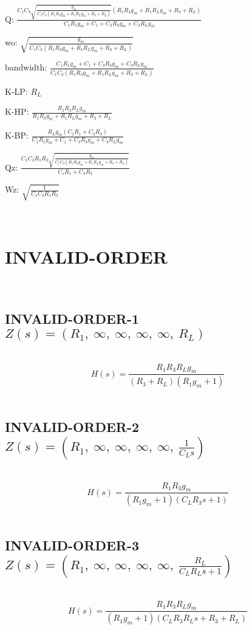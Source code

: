 \documentclass{article}
\begin{document}
Q: $\frac{C_{1} C_{3} \sqrt{\frac{g_{m}}{C_{1} C_{3} \left(R_{1} R_{3} g_{m} + R_{1} R_{L} g_{m} + R_{3} + R_{L}\right)}} \left(R_{1} R_{3} g_{m} + R_{1} R_{L} g_{m} + R_{3} + R_{L}\right)}{C_{1} R_{1} g_{m} + C_{1} + C_{3} R_{3} g_{m} + C_{3} R_{L} g_{m}}$\ 

wo: $\sqrt{\frac{g_{m}}{C_{1} C_{3} \left(R_{1} R_{3} g_{m} + R_{1} R_{L} g_{m} + R_{3} + R_{L}\right)}}$\ 

bandwidth: $\frac{C_{1} R_{1} g_{m} + C_{1} + C_{3} R_{3} g_{m} + C_{3} R_{L} g_{m}}{C_{1} C_{3} \left(R_{1} R_{3} g_{m} + R_{1} R_{L} g_{m} + R_{3} + R_{L}\right)}$\ 

K-LP: $R_{L}$\ 

K-HP: $\frac{R_{1} R_{3} R_{L} g_{m}}{R_{1} R_{3} g_{m} + R_{1} R_{L} g_{m} + R_{3} + R_{L}}$\ 

K-BP: $\frac{R_{L} g_{m} \left(C_{1} R_{1} + C_{3} R_{3}\right)}{C_{1} R_{1} g_{m} + C_{1} + C_{3} R_{3} g_{m} + C_{3} R_{L} g_{m}}$\ 

Qz: $\frac{C_{1} C_{3} R_{1} R_{3} \sqrt{\frac{g_{m}}{C_{1} C_{3} \left(R_{1} R_{3} g_{m} + R_{1} R_{L} g_{m} + R_{3} + R_{L}\right)}}}{C_{1} R_{1} + C_{3} R_{3}}$\ 

Wz: $\sqrt{\frac{1}{C_{1} C_{3} R_{1} R_{3}}}$\ 

\ 

\section{INVALID-ORDER}\ 
\subsection{INVALID-ORDER-1 $Z(s) = \left( R_{1}, \  \infty, \  \infty, \  \infty, \  \infty, \  R_{L}\right)$ } \ 
\textbf{\[H(s) = \frac{R_{1} R_{3} R_{L} g_{m}}{\left(R_{3} + R_{L}\right) \left(R_{1} g_{m} + 1\right)}\] } \ 
\subsection{INVALID-ORDER-2 $Z(s) = \left( R_{1}, \  \infty, \  \infty, \  \infty, \  \infty, \  \frac{1}{C_{L} s}\right)$ } \ 
\textbf{\[H(s) = \frac{R_{1} R_{3} g_{m}}{\left(R_{1} g_{m} + 1\right) \left(C_{L} R_{3} s + 1\right)}\] } \ 
\subsection{INVALID-ORDER-3 $Z(s) = \left( R_{1}, \  \infty, \  \infty, \  \infty, \  \infty, \  \frac{R_{L}}{C_{L} R_{L} s + 1}\right)$ } \ 
\textbf{\[H(s) = \frac{R_{1} R_{3} R_{L} g_{m}}{\left(R_{1} g_{m} + 1\right) \left(C_{L} R_{3} R_{L} s + R_{3} + R_{L}\right)}\] } \ 
\end{document}
